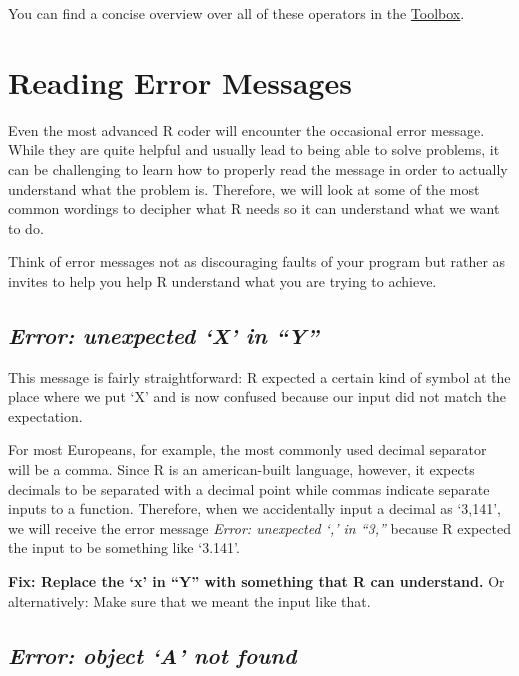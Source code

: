 \documentclass[
]{book}
\begin{document}
You can find a concise overview over all of these operators in the \hyperref[toolbox]{Toolbox}.

\section{Reading Error Messages}\label{reading-error-messages}

Even the most advanced R coder will encounter the occasional error message.
While they are quite helpful and usually lead to being able to solve problems, it can be challenging to learn how to properly read the message in order to actually understand what the problem is.
Therefore, we will look at some of the most common wordings to decipher what R needs so it can understand what we want to do.

Think of error messages not as discouraging faults of your program but rather as invites to help you help R understand what you are trying to achieve.

\subsection*{\texorpdfstring{\emph{Error: unexpected `X' in ``Y''}}{Error: unexpected `X' in ``Y''}}\label{error-unexpected-x-in-y}

This message is fairly straightforward:
R expected a certain kind of symbol at the place where we put `X' and is now confused because our input did not match the expectation.

For most Europeans, for example, the most commonly used decimal separator will be a comma.
Since R is an american-built language, however, it expects decimals to be separated with a decimal point while commas indicate separate inputs to a function.
Therefore, when we accidentally input a decimal as `3,141', we will receive the error message \emph{Error: unexpected `,' in ``3,''} because R expected the input to be something like `3.141'.

\textbf{Fix: Replace the `x' in ``Y'' with something that R can understand.} Or alternatively: Make sure that we meant the input like that.

\subsection*{\texorpdfstring{\emph{Error: object `A' not found}}{Error: object `A' not found}}\label{error-object-a-not-found}
\end{document}
